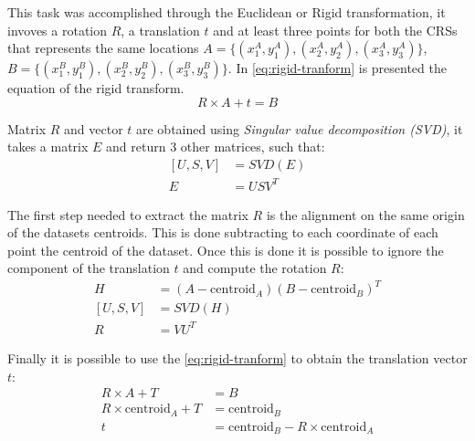 This task was accomplished through the Euclidean or Rigid transformation, it invoves a rotation $R$, a translation $t$ and at least three points for both the CRSs that represents the same locations $A=\{(x_1^A, y_1^A), (x_2^A, y_2^A), (x_3^A, y_3^A)\}$, $B=\{(x_1^B, y_1^B), (x_2^B, y_2^B), (x_3^B, y_3^B)\}$. In \cref{eq:rigid-tranform} is presented the equation of the rigid transform.
\begin{equation}
    R\times A+t = B
    \label{eq:rigid-tranform}
\end{equation}

Matrix $R$ and vector $t$ are obtained using \textit{Singular value decomposition (SVD)}, it takes a matrix $E$ and return 3 other matrices, such that: 
\begin{equation}
    \begin{aligned}
        [U, S, V] &= SVD(E)\\
        E &= USV^T
    \end{aligned}
    \label{eq:singular-value-decomposition}
\end{equation}

The first step needed to extract the matrix $R$ is the alignment on the same origin of the datasets centroids. This is done subtracting to each coordinate of each point the centroid of the dataset. Once this is done it is possible to ignore the component of the translation $t$ and compute the rotation $R$:
\begin{equation}
    \begin{aligned}
        H &=(A-\text{centroid}_A)(B-\text{centroid}_B)^T\\
        [U, S, V] &= SVD(H)\\
        R &=VU^T
    \end{aligned}
    \label{eq:rotation-matrix}
\end{equation}

Finally it is possible to use the \cref{eq:rigid-tranform} to obtain the translation vector $t$:
\begin{equation}
    \begin{aligned}
        R\times A + T &= B\\
        R\times \text{centroid}_A + T &= \text{centroid}_B\\
        t &= \text{centroid}_B - R\times \text{centroid}_A
    \end{aligned}
    \label{eq:translation-vector}
\end{equation}

